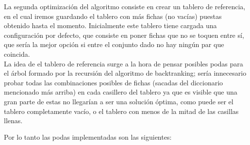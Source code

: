 La segunda optimizaci\'on del algoritmo consiste en crear un tablero de referencia, en el cual iremos guardando el tablero con m\'as fichas (no vac\'ias) puestas obtenido hasta el momento. Inicialmente este tablero tiene cargada una configuraci\'on por defecto, que consiste en poner fichas que no se toquen entre s\'i, que ser\'ia la mejor opci\'on si entre el conjunto dado no hay ning\'un par que coincida.\\

La idea de el tablero de referencia surge a la hora de pensar posibles podas para el \'arbol formado por la recursi\'on del algoritmo de backtranking; ser\'ia innecesario probar todas las combinaciones posibles de fichas (sacadas del diccionario mencionado m\'as arriba) en cada casillero del tablero ya que es  visible que una gran parte de estas no llegar\'ian a ser una soluci\'on \'optima, como puede ser el tablero completamente vac\'io, o el tablero con menos de la mitad de las casillas llenas.

Por lo tanto las podas implementadas son las siguientes:

